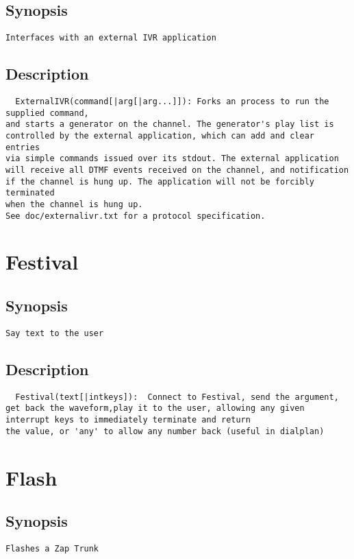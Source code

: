 \subsection{Synopsis}
\begin{verbatim}
Interfaces with an external IVR application
\end{verbatim}
\subsection{Description}
\begin{verbatim}
  ExternalIVR(command[|arg[|arg...]]): Forks an process to run the supplied command,
and starts a generator on the channel. The generator's play list is
controlled by the external application, which can add and clear entries
via simple commands issued over its stdout. The external application
will receive all DTMF events received on the channel, and notification
if the channel is hung up. The application will not be forcibly terminated
when the channel is hung up.
See doc/externalivr.txt for a protocol specification.

\end{verbatim}


\section{Festival}
\subsection{Synopsis}
\begin{verbatim}
Say text to the user
\end{verbatim}
\subsection{Description}
\begin{verbatim}
  Festival(text[|intkeys]):  Connect to Festival, send the argument, get back the waveform,play it to the user, allowing any given interrupt keys to immediately terminate and return
the value, or 'any' to allow any number back (useful in dialplan)

\end{verbatim}


\section{Flash}
\subsection{Synopsis}
\begin{verbatim}
Flashes a Zap Trunk
\end{verbatim}
